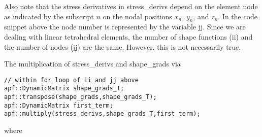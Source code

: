 Also note that the stress derivatives in stress\_derivs depend on the element node as indicated by the subscript $n$ on the nodal positions $x_n$, $y_n$, and $z_n$. In the code snippet above the node number is represented by the variable jj. Since we are dealing with linear tetrahedral elements, the number of shape functions (ii)  and the number of nodes (jj) are the same. However, this is not necessarily true.

The multiplication of stress\_derivs and shape\_grads via 
%
\begin{lstlisting}
// within for loop of ii and jj above
apf::DynamicMatrix shape_grads_T;
apf::transpose(shape_grads,shape_grads_T);
apf::DynamicMatrix first_term;
apf::multiply(stress_derivs,shape_grads_T,first_term);
\end{lstlisting}
%
where 
%
